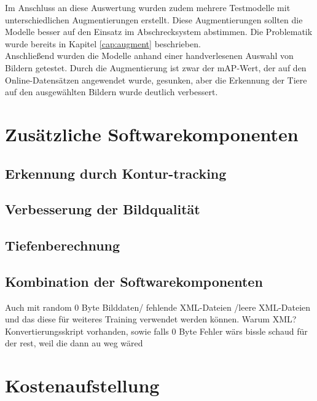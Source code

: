 Im Anschluss an diese Auswertung wurden zudem mehrere Testmodelle mit unterschiedlichen Augmentierungen erstellt. Diese Augmentierungen sollten die Modelle besser auf den Einsatz im Abschrecksystem abstimmen. Die Problematik wurde bereits in Kapitel \ref{cap:augment} beschrieben.
\\
Anschließend wurden die Modelle anhand einer handverlesenen Auswahl von Bildern getestet. Durch die Augmentierung ist zwar der \ac{mAP}-Wert, der auf den Online-Datensätzen angewendet wurde, gesunken, aber die Erkennung der Tiere auf den ausgewählten Bildern wurde deutlich verbessert.

\section{Zusätzliche Softwarekomponenten}

\subsection{Erkennung durch Kontur-tracking}

\subsection{Verbesserung der Bildqualität}

\subsection{Tiefenberechnung} \label{cap:calc_depth}

\subsection{Kombination der Softwarekomponenten}
Auch mit random 0 Byte Bilddaten/ fehlende XML-Dateien /leere XML-Dateien und das diese für weiteres Training verwendet werden können. Warum XML? Konvertierungsskript vorhanden, sowie falls 0 Byte Fehler wärs bissle schaud für der rest, weil die dann au weg wäred
\section{Kostenaufstellung}

